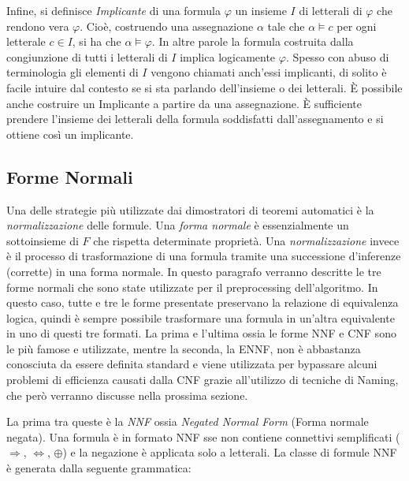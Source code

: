 \documentclass[./main.tex]{subfiles}
\begin{document}
Infine, si definisce \textit{Implicante} di una formula $\varphi$ un insieme $I$ di letterali di $\varphi$ che rendono vera $\varphi$. Cioè, costruendo una
assegnazione $\alpha$ tale che $\alpha \models c$ per ogni letterale $c \in I$, si ha che $\alpha \models \varphi$. In altre parole la formula 
costruita dalla congiunzione di tutti i letterali di $I$ implica logicamente $\varphi$. Spesso con abuso di terminologia gli elementi di $I$ vengono chiamati
anch'essi implicanti, di solito è facile intuire dal contesto se si sta parlando dell'insieme o dei letterali.
È possibile anche costruire un Implicante a partire da una assegnazione. È sufficiente prendere l'insieme dei letterali della formula soddisfatti dall'assegnamento e 
si ottiene così un implicante.


\subsection{Forme Normali} \label{sec:forme_normali}
Una delle strategie più utilizzate dai dimostratori di teoremi automatici è la \textit{normalizzazione} delle formule. Una \textit{forma normale}
è essenzialmente un sottoinsieme di $F$ che rispetta determinate proprietà. Una \textit{normalizzazione} invece è il processo di trasformazione di una formula
tramite una successione d'inferenze (corrette) in una forma normale.
In questo paragrafo verranno descritte le tre forme normali che sono state utilizzate per il preprocessing
dell'algoritmo. In questo caso, tutte e tre le forme presentate preservano la relazione di equivalenza logica, quindi è sempre possibile
trasformare una formula in un'altra equivalente in uno di questi tre formati. 
La prima e l'ultima ossia le forme NNF e CNF sono le più famose e utilizzate, mentre la seconda, la ENNF, non è abbastanza conosciuta da essere definita standard
e viene utilizzata per bypassare alcuni problemi di efficienza causati dalla CNF grazie all'utilizzo di tecniche di Naming, che però verranno discusse nella prossima sezione.

La prima tra queste è la \textit{NNF} ossia \textit{Negated Normal Form} (Forma normale negata). Una formula è in formato NNF 
sse non contiene connettivi semplificati ($\Rightarrow$, $\Leftrightarrow$, $\oplus$) e la negazione è applicata solo a letterali. La classe di formule 
NNF è generata dalla seguente grammatica:
\end{document}
